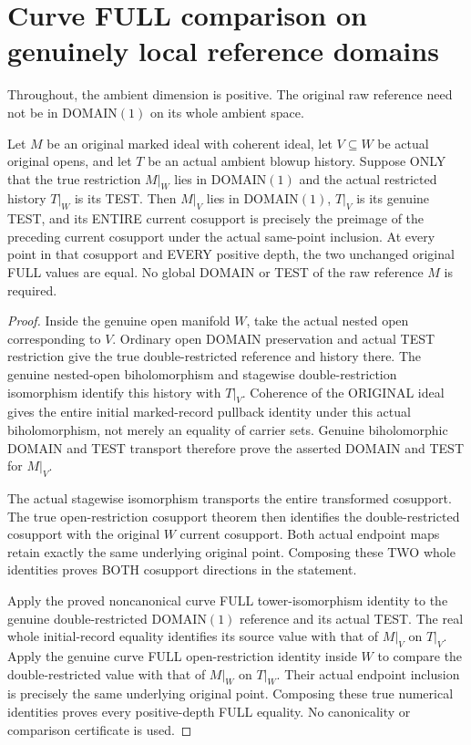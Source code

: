 \section{Curve FULL comparison on genuinely local reference domains}

Throughout, the ambient dimension is positive. The original raw reference
need not be in DOMAIN$(1)$ on its whole ambient space.

\begin{theorem}
\label{hir:original-curve-local-domain-nested-full-comparison}
\leanok
Let $M$ be an original marked ideal with coherent ideal, let $V\subseteq W$
be actual original opens, and let $T$ be an actual ambient blowup history.
Suppose ONLY that the true restriction $M|_W$ lies in DOMAIN$(1)$ and the
actual restricted history $T|_W$ is its TEST. Then $M|_V$ lies in
DOMAIN$(1)$, $T|_V$ is its genuine TEST, and its ENTIRE current cosupport
is precisely the preimage of the preceding current cosupport under the
actual same-point inclusion. At every point in that cosupport and EVERY
positive depth, the two unchanged original FULL values are equal.
No global DOMAIN or TEST of the raw reference $M$ is required.
\end{theorem}
\begin{proof}
Inside the genuine open manifold $W$, take the actual nested open
corresponding to $V$. Ordinary open DOMAIN preservation and actual TEST
restriction give the true double-restricted reference and history there.
The genuine nested-open biholomorphism and stagewise double-restriction
isomorphism identify this history with $T|_V$. Coherence of the ORIGINAL
ideal gives the entire initial marked-record pullback identity under this
actual biholomorphism, not merely an equality of carrier sets. Genuine
biholomorphic DOMAIN and TEST transport therefore prove the asserted
DOMAIN and TEST for $M|_V$.

The actual stagewise isomorphism transports the entire transformed
cosupport. The true open-restriction cosupport theorem then identifies
the double-restricted cosupport with the original $W$ current cosupport.
Both actual endpoint maps retain exactly the same underlying original
point. Composing these TWO whole identities proves BOTH cosupport
directions in the statement.

Apply the proved noncanonical curve FULL tower-isomorphism identity to
the genuine double-restricted DOMAIN$(1)$ reference and its actual TEST.
The real whole initial-record equality identifies its source value with
that of $M|_V$ on $T|_V$. Apply the genuine curve FULL open-restriction
identity inside $W$ to compare the double-restricted value with that of
$M|_W$ on $T|_W$. Their actual endpoint inclusion is precisely the same
underlying original point. Composing these true numerical identities
proves every positive-depth FULL equality. No canonicality or comparison
certificate is used.
\end{proof}

